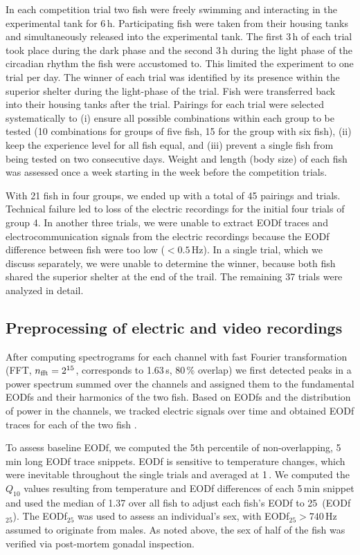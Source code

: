 In each competition trial two fish were freely swimming and interacting in the experimental tank for 6\,h. Participating fish were taken from their housing tanks and simultaneously released into the experimental tank. The first 3\,h of each trial took place during the dark phase and the second 3\,h during the light phase of the circadian rhythm the fish were accustomed to. This limited the experiment to one trial per day. The winner of each trial was identified by its presence within the superior shelter during the light-phase of the trial. Fish were transferred back into their housing tanks after the trial. Pairings for each trial were selected systematically to (i) ensure all possible combinations within each group to be tested (10 combinations for groups of five fish, 15 for the group with six fish), (ii) keep the experience level for all fish equal, and (iii) prevent a single fish from being tested on two consecutive days. Weight and length (body size) of each fish was assessed once a week starting in the week before the competition trials.

With 21 fish in four groups, we ended up with a total of 45 pairings and trials. Technical failure led to loss of the electric recordings for the initial four trials of group 4. In another three trials, we were unable to extract EODf traces and electrocommunication signals from the electric recordings because the EODf difference between fish were too low ($<0.5$\,Hz). In a single trial, which we discuss separately, we were unable to determine the winner, because both fish shared the superior shelter at the end of the trail. The remaining 37 trials were analyzed in detail.

\subsection{Preprocessing of electric and video recordings}

After computing spectrograms for each channel with fast Fourier transformation (FFT, $n_{\rm fft}=2^{15}$, corresponds to 1.63\,s, 80\,\% overlap) we first detected peaks in a power spectrum summed over the channels and assigned them to the fundamental EODfs and their harmonics of the two fish. Based on EODfs and the distribution of power in the channels, we tracked electric signals over time and obtained EODf traces for each of the two fish \citep{Henninger2018,Henninger2020, Madhav2018}.

To assess baseline EODf, we computed the 5th percentile of non-overlapping, 5\,min long EODf trace snippets. EODf is sensitive to temperature changes, which were inevitable throughout the single trials and averaged at 1\,\celsius. We computed the $Q_{10}$ values resulting from temperature and EODf differences of each 5\,min snippet and used the median of 1.37 over all fish to adjust each fish’s EODf to 25\,\celsius{} (EODf$_{25}$). The EODf$_{25}$ was used to assess an individual’s sex, with EODf$_{25} > 740$\,Hz assumed to originate from males. As noted above, the sex of half of the fish was verified via post-mortem gonadal inspection.

